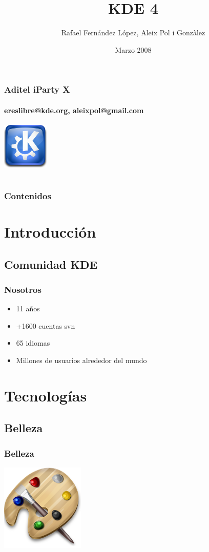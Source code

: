 \documentclass[12pt]{beamer}
\title{KDE 4}
\author{Rafael Fernández López, Aleix Pol i Gonzàlez}
\institute{}
\date{Marzo 2008}
\begin{document}
\begin{frame}
	\titlepage
	\frametitle{Aditel iParty X}
	\framesubtitle{ereslibre@kde.org, aleixpol@gmail.com}
	\begin{center}
	\includegraphics[width=2.2cm]{imatges/kde.png}
	\end{center}
\end{frame}

\section*{}
\begin{frame}
  \frametitle{Contenidos}
  \tableofcontents
\end{frame}


\section{Introducción}
\subsection{Comunidad KDE}
	\begin{frame}
		\frametitle{Nosotros}
		\begin {itemize}
			\item 11 años
			\item +1600 cuentas svn
			\item 65 idiomas
			\item Millones de usuarios alrededor del mundo
		\end {itemize}
	\end{frame}

\section{Tecnologías}
\subsection{Belleza}

\begin {frame}
\frametitle{Belleza}
\begin{center}
	\includegraphics[width=150px]{imatges/beauty.png}
\end{center}
\end {frame}
\end{document}
